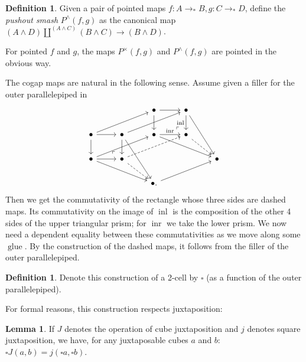 \documentclass{amsart}
\theoremstyle{definition}
\newtheorem{de}[theorem]{Definition}
\newtheorem{lem}[theorem]{Lemma}
\newcommand{\inl}{\operatorname{inl}}
\newcommand{\inr}{\operatorname{inr}}
\newcommand{\glue}{\operatorname{glue}}
\newcommand{\pto}{\to_*}
\begin{document}
\begin{de}\label{de:PO-smash}
    Given a pair of pointed maps $f: A \pto B, g: C \pto D$, define the \textit{pushout smash} $P^\wedge(f,g)$ as the canonical map $(A \wedge D) \coprod^{(A \wedge C)} (B \wedge C) \to (B \wedge D)$.
\end{de}
For pointed $f$ and $g$, the maps $P^\times(f,g)$ and $P^\wedge(f,g)$ are pointed in the obvious way.


The cogap maps are natural in the following sense. Assume given a filler for the outer parallelepiped in
\[\begin{tikzcd}
	&& \bullet & \bullet \\
	\bullet & \bullet & \bullet & \bullet \\
	\bullet & \bullet &&& \bullet \\
	&& {\bullet.}
	\arrow[from=1-3, to=1-4]
	\arrow[from=1-3, to=2-3]
	\arrow["\inl"', from=1-4, to=2-4]
	\arrow[from=1-4, to=3-5]
	\arrow[from=2-1, to=1-3]
	\arrow[from=2-1, to=2-2]
	\arrow[from=2-1, to=3-1]
	\arrow[from=2-2, to=1-4]
	\arrow[from=2-2, to=3-2]
	\arrow[from=2-2, to=4-3]
	\arrow["\inr", from=2-3, to=2-4]
	\arrow[from=2-3, to=3-5]
	\arrow["\lrcorner"{anchor=center, pos=0.125, rotate=180}, draw=none, from=2-4, to=1-3]
	\arrow[dashed, from=2-4, to=3-5]
	\arrow[from=3-1, to=2-3]
	\arrow[from=3-1, to=3-2]
	\arrow[from=3-1, to=4-3]
	\arrow["\lrcorner"{anchor=center, pos=0.125, rotate=180}, draw=none, from=3-2, to=2-1]
	\arrow[dashed, from=3-2, to=2-4]
	\arrow[dashed, from=3-2, to=4-3]
	\arrow[from=4-3, to=3-5]
\end{tikzcd}\]
Then we get the commutativity of the rectangle whose three sides are dashed maps. Its commutativity on the image of $\inl$ is the composition of the other 4 sides of the upper triangular prism; for $\inr$ we take the lower prism. We now need a dependent equality between these commutativities as we move along some $\glue$. By the construction of the dashed maps, it follows from the filler of the outer parallelepiped.

\begin{de}\label{de:cogap-nat}
    Denote this construction of a 2-cell by $\square$ (as a function of the outer parallelepiped).
\end{de}

For formal reasons, this construction respects juxtaposition:
\begin{lem}\label{le:cogap-juxt-commute}
    If $J$ denotes the operation of cube juxtaposition and $j$ denotes square juxtaposition, we have, for any juxtaposable cubes $a$ and $b$: $\square J(a,b) = j(\square a, \square b).$
\end{lem}
\end{document}
